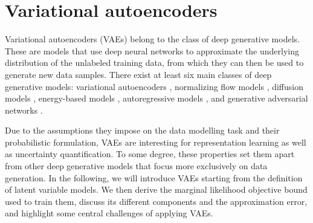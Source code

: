 \section{Variational autoencoders}
%
Variational autoencoders (VAEs) belong to the class of deep generative models. 
These are models that use deep neural networks to approximate the underlying distribution of the unlabeled training data, from which they can then be used to generate new data samples. 
There exist at least six main classes of deep generative models: variational autoencoders \parencite{kingma_autoencoding_2014,rezende_stochastic_2014,ranganath_hierarchical_2016,vahdat_nvae_2020,child_very_2021}, normalizing flow models \parencite{dinh_nice_2015,rezende_variational_2015,dinh_density_2017,kingma_glow_2018,grathwohl_ffjord_2018}, diffusion models \parencite{sohl-dickstein_deep_2015,song_generative_2019, ho_denoising_2020, vahdat_scorebased_2021}, energy-based models \parencite{lecun_tutorial_2006,hinton_fast_2006,salakhutdinov_efficient_2010,du_implicit_2019}, autoregressive models \parencite{oord_conditional_2016,oord_wavenet_2016,radford_improving_2018}, and generative adversarial networks \parencite{goodfellow_generative_2014,arjovsky_wasserstein_2017,brock_large_2019,karras_stylebased_2019}. 

Due to the assumptions they impose on the data modelling task and their probabilistic formulation, VAEs are interesting for representation learning as well as uncertainty quantification. To some degree, these properties set them apart from other deep generative models that focus more exclusively on data generation. 
In the following, we will introduce VAEs starting from the definition of latent variable models. We then derive the marginal likelihood objective bound used to train them, discuss its different components and the approximation error, and highlight some central challenges of applying VAEs. 


